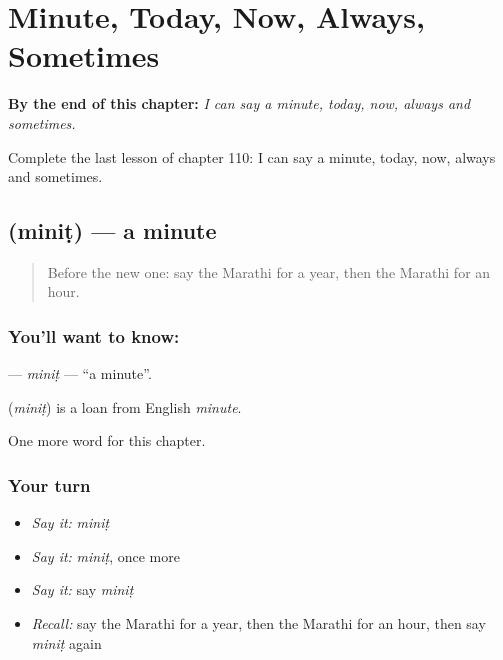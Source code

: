 
\chapter{Minute, Today, Now, Always, Sometimes}
\label{ch:mr-minute-today-now-always-sometimes}

\begin{chapteropening}
\textbf{By the end of this chapter:} \emph{I can say a minute, today, now, always and sometimes.}

Complete the last lesson of chapter 110: I can say a minute, today, now, always and sometimes.
\end{chapteropening}

\section[\texorpdfstring{\mr{मिनिट} (miniṭ)}{मिनिट (miniṭ)}]{ (miniṭ) — a minute}

\label{lesson:MR-C110-minit}



\begin{quote}
Before the new one: say the Marathi for a year, then the Marathi for an hour.
\end{quote}

\subsection*{You'll want to know: }
\textbf{} — \emph{miniṭ} — \textquotedblleft{}a minute\textquotedblright{}.

\begin{cousinweb}
\textbf{} (\emph{miniṭ}) is a loan from English \emph{minute}.
\end{cousinweb}

\begin{grammarlens}[title={What you've built}]
One more word for this chapter.
\end{grammarlens}

\subsection*{Your turn}
\begin{itemize}
\raggedright
  \item \emph{Say it:} \emph{miniṭ}
  \item \emph{Say it:} \emph{miniṭ}, once more
  \item \emph{Say it:} say \emph{miniṭ}
  \item \emph{Recall:} say the Marathi for a year, then the Marathi for an hour, then say \emph{miniṭ} again
\end{itemize}

